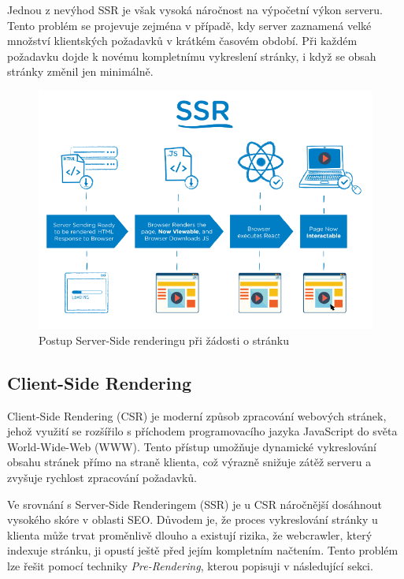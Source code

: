 Jednou z nevýhod SSR je však vysoká náročnost na výpočetní výkon serveru. Tento problém se projevuje zejména v případě, kdy server zaznamená velké množství klientských požadavků v krátkém časovém období. Při každém požadavku dojde k novému kompletnímu vykreslení stránky, i když se obsah stránky změnil jen minimálně.

\begin{figure}[H]
    \centering
    \includegraphics[width=1.0\textwidth]{figures/server-side-rendering}
    \caption{Postup Server-Side renderingu při žádosti o stránku \cite{rendering-diff}}
    \label{fig:server-side-rendering}
\end{figure}

\subsection{Client-Side Rendering}
\label{subsec:dev-request-processing-client-side-rendering}
Client-Side Rendering (CSR) je moderní způsob zpracování webových stránek, jehož využití se rozšířilo s příchodem programovacího jazyka JavaScript do světa World-Wide-Web (WWW). Tento přístup umožňuje dynamické vykreslování obsahu stránek přímo na straně klienta, což výrazně snižuje zátěž serveru a zvyšuje rychlost zpracování požadavků.

Ve srovnání s Server-Side Renderingem (SSR) je u CSR náročnější dosáhnout vysokého skóre v oblasti SEO. Důvodem je, že proces vykreslování stránky u klienta může trvat proměnlivě dlouho a existují rizika, že webcrawler, který indexuje stránku, ji opustí ještě před jejím kompletním načtením. Tento problém lze řešit pomocí techniky \textit{Pre-Rendering}, kterou popisuji v následující sekci.

